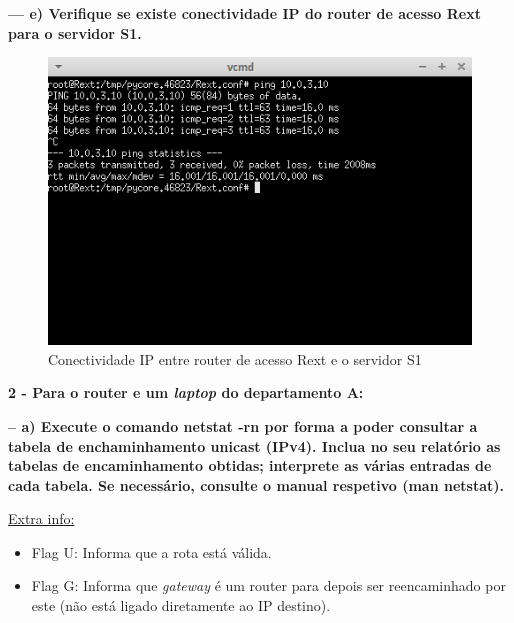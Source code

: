 \documentclass[a4paper]{article}
\begin{document}
\newpage

\textbf{--- e) Verifique se existe conectividade IP do router de acesso Rext para o servidor S1.}\newline
\begin{figure}[h]
    \centering
    \includegraphics[scale=1]{parte2/rext-s1.png}\newline
    \caption{Conectividade IP entre router de acesso Rext e o servidor S1}
    \label{fig:my_label}
\end{figure}

\newpage

\textbf{2 - Para o router e um \textit{laptop} do departamento A:}\newline

\textbf{-- a) Execute o comando \textbf{netstat -rn} por forma a poder consultar a tabela de enchaminhamento unicast (IPv4). Inclua no seu relatório as tabelas de encaminhamento obtidas; interprete as várias entradas de cada tabela. Se necessário, consulte o manual respetivo (\textbf{man netstat}).}\newline

\underline{Extra info:}
\begin{itemize}
    \item Flag U: Informa que a rota está válida.
    \item Flag G: Informa que \textit{gateway} é um router para depois ser reencaminhado por este (não está ligado diretamente ao IP destino).
\end{itemize}
\end{document}
